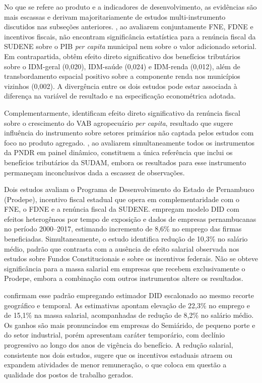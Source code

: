 No que se refere ao produto e a indicadores de desenvolvimento, as evidências são mais escassas e derivam majoritariamente de estudos multi-instrumento discutidos nas subseções anteriores. , ao avaliarem conjuntamente FNE, FDNE e incentivos fiscais, não encontram significância estatística para a renúncia fiscal da SUDENE sobre o PIB \textit{per capita} municipal nem sobre o valor adicionado setorial. Em contrapartida,  obtêm efeito direto significativo dos benefícios tributários sobre o IDM-geral (0,020), IDM-saúde (0,024) e IDM-renda (0,012), além de transbordamento espacial positivo sobre a componente renda nos municípios vizinhos (0,002). A divergência entre os dois estudos pode estar associada à diferença na variável de resultado e na especificação econométrica adotada.

Complementarmente,  identificam efeito direto significativo da renúncia fiscal sobre o crescimento do VAB agropecuário \textit{per capita}, resultado que sugere influência do instrumento sobre setores primários não captada pelos estudos com foco no produto agregado. , ao avaliarem simultaneamente todos os instrumentos da PNDR em painel dinâmico, constituem a única referência que inclui os benefícios tributários da SUDAM, embora os resultados para esse instrumento permaneçam inconclusivos dada a escassez de observações.

Dois estudos avaliam o Programa de Desenvolvimento do Estado de Pernambuco (Prodepe), incentivo fiscal estadual que opera em complementaridade com o FNE, o FDNE e a renúncia fiscal da SUDENE.  empregam modelo DID com efeitos heterogêneos por tempo de exposição e dados de empresas pernambucanas no período 2000--2017, estimando incremento de 8,6\% no emprego das firmas beneficiadas. Simultaneamente, o estudo identifica redução de 10,3\% no salário médio, padrão que contrasta com a ausência de efeito salarial observada nos estudos sobre Fundos Constitucionais e sobre os incentivos federais. Não se obteve significância para a massa salarial em empresas que recebem exclusivamente o Prodepe, embora a combinação com outros instrumentos altere os resultados.

 confirmam esse padrão empregando estimador DID escalonado ao mesmo recorte geográfico e temporal. As estimativas apontam elevação de 22,3\% no emprego e de 15,1\% na massa salarial, acompanhadas de redução de 8,2\% no salário médio. Os ganhos são mais pronunciados em empresas do Semiárido, de pequeno porte e do setor industrial, porém apresentam caráter temporário, com declínio progressivo ao longo dos anos de vigência do benefício. A redução salarial, consistente nos dois estudos, sugere que os incentivos estaduais atraem ou expandem atividades de menor remuneração, o que coloca em questão a qualidade dos postos de trabalho gerados.

